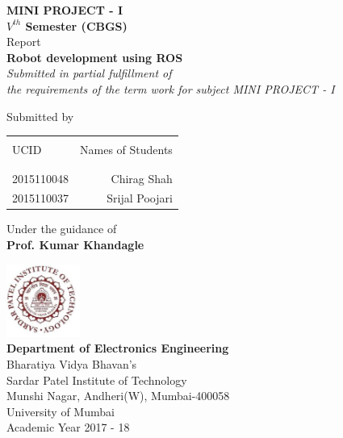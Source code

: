 \begin{titlepage}

\begin{center}

\textup{\small {\bf MINI PROJECT - I\\  $V ^{th}$ Semester (CBGS) } \\ Report}\\[0.2in]

\Large \textbf {Robot development using ROS}\\[0.5in]

       \small \emph{Submitted in partial fulfillment of\\
        the requirements of the term work for subject MINI PROJECT - I}
        \vspace{1in}

     

\normalsize Submitted by \\
\begin{table}[h]
\centering
\begin{tabular}{lr}\hline \\
UCID & Names of Students \\ \\ \hline
\\
2015110048 &  Chirag Shah \\
2015110037 &  Srijal Poojari \\ 
 \hline 
\end{tabular}
\end{table}

\vspace{.1in}
Under the guidance of\\
{\textbf{Prof. Kumar Khandagle}}\\[0.2in]

\vfill

\includegraphics[width=0.18\textwidth]{spit_logo.jpg}\\[0.1in]

\textbf {Department of Electronics Engineering}\\
Bharatiya  Vidya Bhavan's\\
Sardar Patel Institute of Technology\\
Munshi Nagar, Andheri(W), Mumbai-400058\\
University of Mumbai\\
Academic Year 2017 - 18\\


\end{center}

\end{titlepage}
